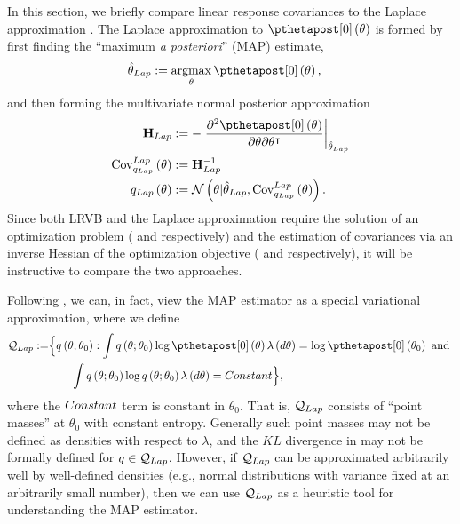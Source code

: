 \documentclass{article}\usepackage[]{graphicx}\usepackage[]{color}
\theoremstyle{definition}
\theoremstyle{plain}
\theoremstyle{plain}
\theoremstyle{plain}
\theoremstyle{definition}
\theoremstyle{plain}
\theoremstyle{plain}
\begin{document}
In this section, we briefly compare linear response covariances to
the Laplace approximation \citep[Chapter 13]{gelman:2014:bayesian}.
The Laplace approximation to $\pzeropost\left(\theta\right)$ is formed
by first finding the ``maximum \textit{a posteriori}'' (MAP) estimate,
\begin{align}
\laptheta & :=\argmax_{\theta}\pzeropost\left(\theta\right),\label{eq:laplace_opt}
\end{align}
and then forming the multivariate normal posterior approximation
\begin{align}
\laphess & :=-\left.\frac{\partial^{2}\pzeropost\left(\theta\right)}
    {\partial\theta\partial\theta^{\trans}}\right|_{\laptheta}
    \label{eq:laplace_hess}\\
\covlap\left(\theta\right) & :=\laphess^{-1}\nonumber \\
\lap\left(\theta\right) &
    :=\mathcal{N}\left(\theta \vert \laptheta,\covlap\left(\theta\right)\right).
    \label{eq:laplace_approx}
\end{align}
Since both LRVB and the Laplace approximation require the solution
of an optimization problem ( and
respectively) and the estimation of covariances via an inverse Hessian
of the optimization objective (
and  respectively), it will be instructive
to compare the two approaches.

Following \citet{neal:1998:variationalEM}, we can, in fact, view the
MAP estimator as a special variational approximation, where
we define
\begin{align*}
\qlap:= & \Big\{ q\left(\theta;\theta_{0}\right):
    \int q\left(\theta;\theta_{0}\right)\log\pzeropost\left(\theta\right)
    \lambda\left(d\theta\right)=\log\pzeropost\left(\theta_{0}\right)\textrm{ and }\\
 & \quad\quad\int q\left(\theta;\theta_{0}\right)\log q\left(\theta;\theta_{0}\right)
 \lambda\left(d\theta\right)=\constant\Big\},
\end{align*}
where the $Constant$ term is constant in $\theta_{0}$. That is,
$\mathcal{Q}_{Lap}$ consists of ``point masses'' at $\theta_{0}$ with constant
entropy. Generally such point masses may not be defined as densities
with respect to $\lambda$, and the $KL$ divergence in 
may not be formally defined for $q\in\mathcal{Q}_{Lap}$. However, if $\mathcal{Q}_{Lap}$
can be approximated arbitrarily well by well-defined densities (e.g.,
normal distributions with variance fixed at an arbitrarily small number),
then we can use $\mathcal{Q}_{Lap}$ as a heuristic tool for understanding the
MAP estimator.
\end{document}
